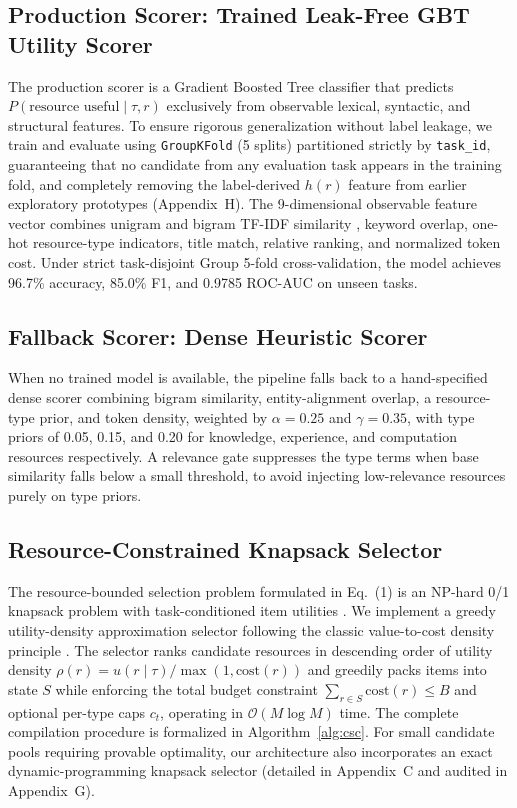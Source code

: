 \documentclass{article}
\begin{document}
\subsection{Production Scorer: Trained Leak-Free GBT Utility Scorer}

The production scorer is a Gradient Boosted Tree classifier \citep{chen2016xgboost} that predicts $P(\text{resource useful} \mid \tau, r)$ exclusively from observable lexical, syntactic, and structural features. To ensure rigorous generalization without label leakage, we train and evaluate using \texttt{GroupKFold} (5 splits) partitioned strictly by \texttt{task\_id}, guaranteeing that no candidate from any evaluation task appears in the training fold, and completely removing the label-derived $h(r)$ feature from earlier exploratory prototypes (Appendix~H). The 9-dimensional observable feature vector combines unigram and bigram TF-IDF similarity \citep{pedregosa2011scikit}, keyword overlap, one-hot resource-type indicators, title match, relative ranking, and normalized token cost. Under strict task-disjoint Group 5-fold cross-validation, the model achieves 96.7\% accuracy, 85.0\% F1, and 0.9785 ROC-AUC on unseen tasks.

\subsection{Fallback Scorer: Dense Heuristic Scorer}

When no trained model is available, the pipeline falls back to a hand-specified dense scorer combining bigram similarity, entity-alignment overlap, a resource-type prior, and token density, weighted by $\alpha = 0.25$ and $\gamma = 0.35$, with type priors of 0.05, 0.15, and 0.20 for knowledge, experience, and computation resources respectively. A relevance gate suppresses the type terms when base similarity falls below a small threshold, to avoid injecting low-relevance resources purely on type priors.

\subsection{Resource-Constrained Knapsack Selector}

The resource-bounded selection problem formulated in Eq.~(1) is an NP-hard 0/1 knapsack problem with task-conditioned item utilities \citep{martello1990knapsack}. We implement a greedy utility-density approximation selector following the classic value-to-cost density principle \citep{dantzig1957discrete}. The selector ranks candidate resources in descending order of utility density $\rho(r) = u(r \mid \tau) / \max(1, \text{cost}(r))$ and greedily packs items into state $S$ while enforcing the total budget constraint $\sum_{r \in S} \text{cost}(r) \leq B$ and optional per-type caps $c_t$, operating in $\mathcal{O}(M \log M)$ time. The complete compilation procedure is formalized in Algorithm~\ref{alg:csc}. For small candidate pools requiring provable optimality, our architecture also incorporates an exact dynamic-programming knapsack selector (detailed in Appendix~C and audited in Appendix~G).
\end{document}

